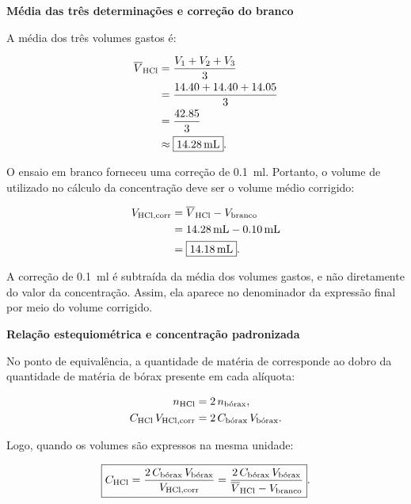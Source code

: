 \documentclass[a4paper,12pt]{article}
\newcommand{\subtitulo}[1]{%
  \par\medskip
  {\color{quadroazul}\bfseries\large #1}\par\smallskip
}
\begin{document}
\subtitulo{Média das três determinações e correção do branco}

A média dos três volumes gastos é:

\begin{align*}
  \overline{V}_{\ce{HCl}}
    &=\frac{V_1+V_2+V_3}{3} \\
    &=\frac{14.40+14.40+14.05}{3} \\
    &=\frac{42.85}{3} \\
    &\approx \boxed{\qty{14.28}{\milli\litre}}.
\end{align*}

O ensaio em branco forneceu uma correção de \qty{0.1}{\milli\litre}. Portanto, o volume de  utilizado no cálculo da concentração deve ser o volume médio corrigido:

\begin{align*}
  V_{\ce{HCl},\text{corr}}
    &=\overline{V}_{\ce{HCl}}-V_{\text{branco}} \\
    &=\qty{14.28}{\milli\litre}-\qty{0.10}{\milli\litre} \\
    &=\boxed{\qty{14.18}{\milli\litre}}.
\end{align*}

\begin{tcolorbox}[
  title=Interpretação da correção,
  colback=quadrocinza,
  colframe=black!65,
  boxrule=0.6pt,
  arc=1mm
]
A correção de \qty{0.1}{\milli\litre} é subtraída da média dos volumes gastos, e não diretamente do valor da concentração. Assim, ela aparece no denominador da expressão final por meio do volume corrigido.
\end{tcolorbox}

\newpage
\subtitulo{Relação estequiométrica e concentração padronizada}

No ponto de equivalência, a quantidade de matéria de  corresponde ao dobro da quantidade de matéria de bórax presente em cada alíquota:

\begin{align*}
  n_{\ce{HCl}} &= 2\,n_{\text{bórax}}, \\
  C_{\ce{HCl}}\,V_{\ce{HCl},\text{corr}}
    &=2\,C_{\text{bórax}}\,V_{\text{bórax}}.
\end{align*}

Logo, quando os volumes são expressos na mesma unidade:

\begin{equation*}
  \boxed{
  C_{\ce{HCl}}
    =\frac{2\,C_{\text{bórax}}\,V_{\text{bórax}}}
           {V_{\ce{HCl},\text{corr}}}
    =\frac{2\,C_{\text{bórax}}\,V_{\text{bórax}}}
           {\overline{V}_{\ce{HCl}}-V_{\text{branco}}}
  }.
\end{equation*}
\end{document}
